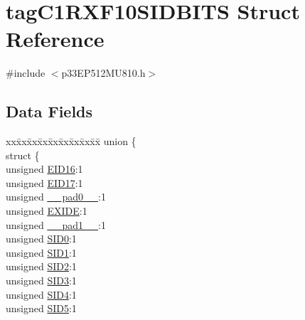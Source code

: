 \hypertarget{structtag_c1_r_x_f10_s_i_d_b_i_t_s}{}\section{tag\+C1\+R\+X\+F10\+S\+I\+D\+B\+I\+TS Struct Reference}
\label{structtag_c1_r_x_f10_s_i_d_b_i_t_s}


{\ttfamily \#include $<$p33\+E\+P512\+M\+U810.\+h$>$}

\subsection*{Data Fields}
\begin{DoxyCompactItemize}
\item 
\begin{tabbing}
xx\=xx\=xx\=xx\=xx\=xx\=xx\=xx\=xx\=\kill
union \{\\
\>struct \{\\
\>\>unsigned \hyperlink{structtag_c1_r_x_f10_s_i_d_b_i_t_s_a6dd5663b0c9838c56db040560ca0efa1}{EID16}:1\\
\>\>unsigned \hyperlink{structtag_c1_r_x_f10_s_i_d_b_i_t_s_aa648615464b0eb29967529333eee9fd9}{EID17}:1\\
\>\>unsigned \hyperlink{structtag_c1_r_x_f10_s_i_d_b_i_t_s_adf71f3d8410c1f1dbbc96680a92c49af}{\_\_pad0\_\_}:1\\
\>\>unsigned \hyperlink{structtag_c1_r_x_f10_s_i_d_b_i_t_s_a09ff1c1be3927220bd3dfbc10edfe243}{EXIDE}:1\\
\>\>unsigned \hyperlink{structtag_c1_r_x_f10_s_i_d_b_i_t_s_acaf2d0924a107ec6e8d2e31febaf66f9}{\_\_pad1\_\_}:1\\
\>\>unsigned \hyperlink{structtag_c1_r_x_f10_s_i_d_b_i_t_s_a1ca276ac15df60e1f7b9a6d0011ade93}{SID0}:1\\
\>\>unsigned \hyperlink{structtag_c1_r_x_f10_s_i_d_b_i_t_s_a3405d354f81391f879648f69f504dfc8}{SID1}:1\\
\>\>unsigned \hyperlink{structtag_c1_r_x_f10_s_i_d_b_i_t_s_ad744966dfc49307f731b7045b01b94e5}{SID2}:1\\
\>\>unsigned \hyperlink{structtag_c1_r_x_f10_s_i_d_b_i_t_s_a9345f3e64720be93e83d8dfc827f3f45}{SID3}:1\\
\>\>unsigned \hyperlink{structtag_c1_r_x_f10_s_i_d_b_i_t_s_aefb106fed4bb40e2c3c71ac612c554e3}{SID4}:1\\
\>\>unsigned \hyperlink{structtag_c1_r_x_f10_s_i_d_b_i_t_s_a0f221b3c9612231686bf87ccdcec8489}{SID5}:1\\

\end{tabbing}
\end{DoxyCompactItemize}
